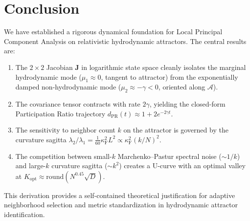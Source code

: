 \documentclass[11pt,a4paper]{article}
\begin{document}
\section{Conclusion}
\label{sec:conclusion}
We have established a rigorous dynamical foundation for Local Principal Component Analysis on relativistic hydrodynamic attractors. The central results are:
\begin{enumerate}
    \item The $2\times 2$ Jacobian $\mathbf{J}$ in logarithmic state space cleanly isolates the marginal hydrodynamic mode ($\mu_1 \approx 0$, tangent to attractor) from the exponentially damped non-hydrodynamic mode ($\mu_2 \approx -\gamma < 0$, oriented along $\mathcal{A}$).
    \item The covariance tensor contracts with rate $2\gamma$, yielding the closed-form Participation Ratio trajectory $d_{\mathrm{PR}}(t) \approx 1 + 2e^{-2\gamma t}$.
    \item The sensitivity to neighbor count $k$ on the attractor is governed by the curvature sagitta $\lambda_2/\lambda_1 = \frac{1}{60}\kappa_{\mathrm{F}}^2 L^2 \propto \kappa_{\mathrm{F}}^2 (k/N)^2$.
    \item The competition between small-$k$ Marchenko--Pastur spectral noise ($\sim 1/k$) and large-$k$ curvature sagitta ($\sim k^2$) creates a U-curve with an optimal valley at $K_{\mathrm{opt}} \approx \mathrm{round}(N^{0.45}\sqrt{D})$.
\end{enumerate}
This derivation provides a self-contained theoretical justification for adaptive neighborhood selection and metric standardization in hydrodynamic attractor identification.
\end{document}
